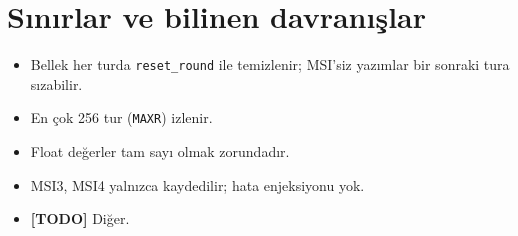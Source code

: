 \documentclass[11pt,a4paper]{article}
\newcommand{\kod}[1]{\texttt{#1}}
\newcommand{\todo}[1]{\textcolor{red!60!black}{\textbf{[TODO]} #1}}
\begin{document}
\section{Sınırlar ve bilinen davranışlar}

\begin{itemize}[nosep]
  \item Bellek her turda \kod{reset\_round} ile temizlenir; MSI'siz yazımlar bir
        sonraki tura sızabilir.
  \item En çok 256 tur (\kod{MAXR}) izlenir.
  \item Float değerler tam sayı olmak zorundadır.
  \item MSI3, MSI4 yalnızca kaydedilir; hata enjeksiyonu yok.
  \item \todo{Diğer.}
\end{itemize}
\end{document}
